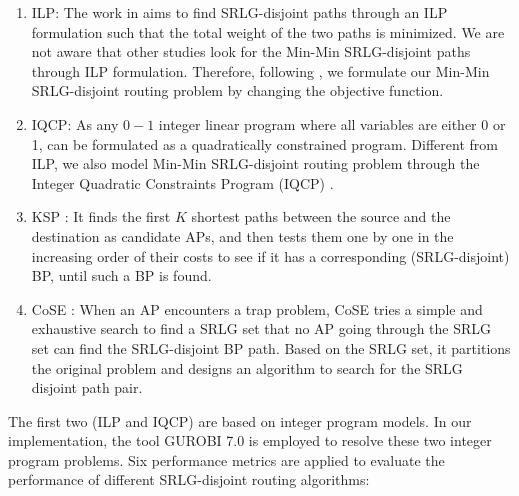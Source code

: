\begin{enumerate}
  \item ILP: The work in \cite{hu2003diverse}  aims to find SRLG-disjoint paths through an ILP formulation such that the total weight of the two paths is minimized. We are not aware that other studies look for the Min-Min SRLG-disjoint paths through ILP formulation. Therefore, following \cite{hu2003diverse}, we formulate  our Min-Min SRLG-disjoint routing problem by changing the objective function.
  \item IQCP: As any $0-1$ integer linear program where all variables are either 0 or 1,   can be formulated as a quadratically constrained program. Different from ILP, we also model Min-Min SRLG-disjoint routing problem through the Integer Quadratic Constraints Program (IQCP) \cite{hu2003diverse}.
  \item KSP \cite{eppstein1998finding}: It finds the first $K$ shortest paths between the source and the destination as candidate APs, and then tests them one by one in the increasing order of their costs to see if it has a corresponding (SRLG-disjoint) BP, until such a BP is found.
  \item CoSE \cite{rostami2007cose}: When an AP encounters a trap problem, CoSE tries a simple and exhaustive search to find a SRLG set that no AP going through the SRLG set can find the SRLG-disjoint BP path. Based on the SRLG set, it partitions the original problem  and designs an algorithm to search for the SRLG disjoint path pair.
\end{enumerate}
The first two (ILP and IQCP) are based on integer program models. In our implementation, the tool GUROBI 7.0 \cite{optimization2012gurobi} is employed to resolve these two integer program problems.  Six performance metrics are applied to evaluate the performance of different SRLG-disjoint routing algorithms:
